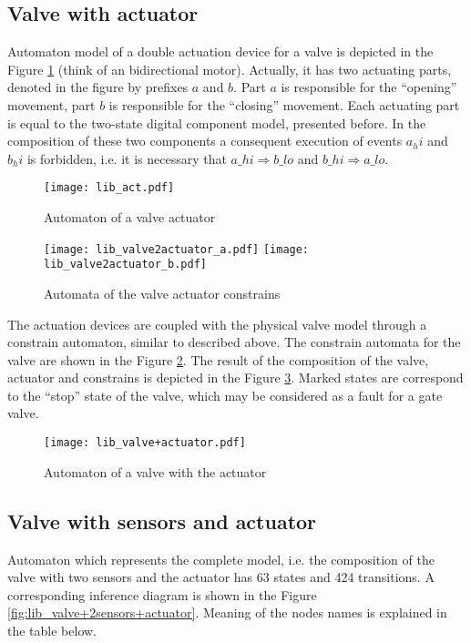 \subsection{Valve with actuator} 

Automaton model of a double actuation device for a valve is depicted in the
Figure \ref{fig:lib_act} (think of an bidirectional motor). Actually, it has two
actuating parts, denoted in the figure by  prefixes $a$ and $b$. Part $a$ is responsible for the ``opening''
movement, part $b$ is responsible for the ``closing'' movement. Each actuating
part is equal to the two-state digital component model, presented before.
In the composition of these two components a consequent execution of events
$a_hi$ and $b_hi$ is forbidden, i.e. it is necessary that $a\_hi \Rightarrow
b\_lo$ and $b\_hi \Rightarrow a\_lo$.

\begin{figure}[!ht]
	\centering
	\texttt{[image: lib\_act.pdf]}
	\caption{Automaton of a valve actuator}
	\label{fig:lib_act}
\end{figure}


\begin{figure}[!ht]
	\centering  
	\texttt{[image: lib\_valve2actuator\_a.pdf]}
	\texttt{[image: lib\_valve2actuator\_b.pdf]}
	\caption{Automata of the valve actuator constrains}
	\label{fig:lib_valve2actuator_a}
\end{figure}

The actuation devices are coupled with the physical valve model through a 
constrain automaton, similar to described above. The constrain automata for
the valve are shown in the Figure \ref{fig:lib_valve2actuator_a}. 
The result of the composition of the valve, actuator and constrains is depicted
in the Figure \ref{fig:lib_valve+actuator}. Marked states are correspond to the
``stop'' state of the valve, which may be considered as a fault for a
gate valve.

\begin{figure}[!ht]
	\centering
	\texttt{[image: lib\_valve+actuator.pdf]}
	\caption{Automaton of a valve with the actuator}
	\label{fig:lib_valve+actuator}
\end{figure}


\subsection{Valve with sensors and actuator}

Automaton which represents the complete model, i.e. the composition of the valve
with two sensors and the actuator has 63 states and 424 transitions. A
corresponding inference diagram is shown in the Figure
\ref{fig:lib_valve+2sensors+actuator}. Meaning of the nodes names is explained
in the table below.

